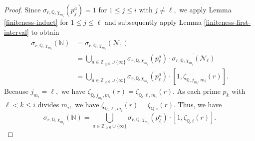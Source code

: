 \documentclass[12pt]{amsart}
\theoremstyle{definition}
\numberwithin{equation}{section}
\newcommand{\Q}{\mathbb{Q}}
\newcommand{\Z}{\mathbb{Z}}
\newcommand{\N}{\mathbb{N}}
\begin{document}
\begin{proof}
    Since $\sigma_{r,\Q,\chi_{m_i}} (p_j^a) = 1$ for $1 \leq j \leq i$ with $j \neq \ell,$ we apply Lemma \ref{finiteness-induct} for $1 \leq j \leq \ell$ and subsequently apply Lemma \ref{finiteness-first-interval}
    to obtain \begin{align*}
        \overline{\sigma_{r, \Q,\chi_{m_i}} (\N)} &= \overline{\sigma_{r, \Q,\chi_{m_i}} (\mathcal{N}_1)} \\
        &= \bigcup_{a \in \Z_{\geq 0} \cup\{\infty\}} \sigma_{r, \Q,\chi_{m_i}} (p_\ell^a) \cdot \overline{\sigma_{r, \Q,\chi_{m_i}} (\mathcal{N}_{\ell})} \\
        &= \bigcup_{a \in \Z_{\geq 0} \cup\{\infty\}} \sigma_{r, \Q,\chi_{m_i}} (p_\ell^a) \cdot [1, \zeta_{\Q, j_{m_i}, m_i}(r)].
    \end{align*} Because $j_{m_i} = \ell,$ we have $\zeta_{\Q, j_{m_i}, m_i}(r) = \zeta_{\Q, \ell, m_i}(r).$ As each prime $p_k$ with $\ell < k \leq i$ divides $m_i,$ we have $\zeta_{\Q,\ell,m_i}(r) = \zeta_{\Q,i}(r).$ Thus, we have $$\overline{\sigma_{r, \Q,\chi_{m_i}} (\N)} = \bigcup_{a \in \Z_{\geq 0} \cup \{\infty\}}  \sigma_{r, \Q,\chi_{m_i}} (p_\ell^a) \cdot [1, \zeta_{\Q, i}(r)].$$


\end{proof}
\end{document}
